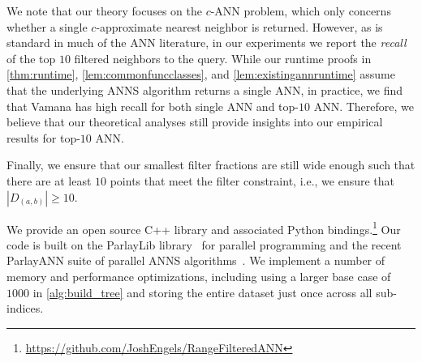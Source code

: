 \documentclass{article}
\newcommand{\myparagraph}[1]{\smallskip\noindent {\bf #1.}}
\theoremstyle{plain}
\theoremstyle{definition}
\theoremstyle{remark}
\newcommand{\shangdi}[1]{{\color{blue}{\bf Shangdi:} #1}}
\newcommand{\julian}[1]{{\color{red}{\bf Julian:} #1}}
\newcommand{\degree}{\ensuremath{\textit{degree}}}
\begin{document}
We note that our theory focuses on the $c$-ANN problem, which only concerns whether a single $c$-approximate nearest neighbor is returned. However, as is standard in much of the ANN literature, in our experiments we report the \textit{recall} of the top $10$ filtered neighbors to the query. While our runtime proofs in
\cref{thm:runtime}, \cref{lem:commonfuncclasses}, and \cref{lem:existingannruntime} 
assume that the underlying ANNS algorithm returns a single ANN, in practice, we find that Vamana has high recall for both single ANN and top-$10$ ANN.
Therefore, we believe that our theoretical analyses still provide insights into our empirical results for top-$10$ ANN.

Finally, we ensure that our smallest filter fractions are still wide enough such that there are at least $10$ points that meet the filter constraint, i.e., we ensure that $|D_{(a, b)}| \ge 10$. 



\myparagraph{Implementation Details}
We provide an open source C++ library and associated Python bindings.\footnote{\url{https://github.com/JoshEngels/RangeFilteredANN}} 
Our code is built on the ParlayLib library~\cite{blelloch2020parlaylib} for parallel programming and the recent ParlayANN suite of parallel ANNS algorithms~\cite{dobson2023scaling}. 
We implement a number of memory and performance optimizations, including using a larger base case of $1000$ in \cref{alg:build_tree} and storing the entire dataset just once across all sub-indices. 

\end{document}

